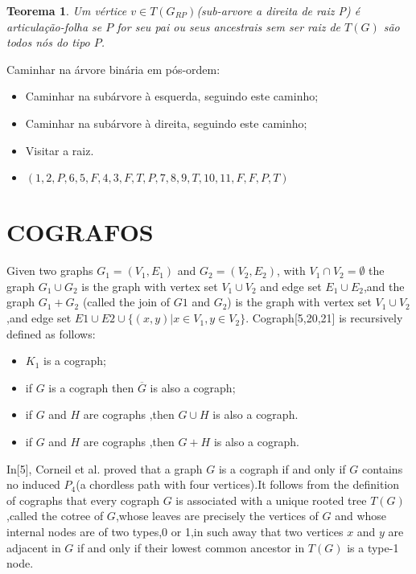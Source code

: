 \documentclass[a4paper,8pt]{article}
\theoremstyle{plain}
\newtheorem{theorem}{Teorema}[section]
\begin{document}
\begin{theorem}
 Um vértice $v\in T(G_{RP})$(sub-arvore a direita de raiz P) é articulação-folha se $P$ for seu pai ou seus ancestrais sem ser raiz de $T(G)$ são todos nós do tipo $P$. 
 \end{theorem}  
 

                                                                                                                    

Caminhar na árvore binária em pós-ordem:
\begin{itemize}
    \item Caminhar na subárvore à esquerda, seguindo este caminho;
    \item Caminhar na subárvore à direita, seguindo este caminho;
    \item Visitar a raiz.
    \item $(1,2,P,6,5,F,4,3,F,T,P,7,8,9,T,10,11,F,F,P,T)$
\end{itemize}


   
   
   
   
   
   
\newpage


\section{COGRAFOS}

Given two graphs $G_1=(V_1,E_1)$ and $G_2=(V_2,E_2)$, with $V_1\cap V_2=\emptyset$ the graph $G_1\cup G_2$ is the graph with vertex set $V_1\cup V_2$ and edge set $E_1\cup E_2$,and the graph $G_1+G_2$ (called the join of $G1$ and $G_2$) is the graph with vertex set $V_1\cup V_2$,and edge set $E1\cup E2 \cup\{(x,y)|x\in V_1,y\in V_2\}$. Cograph[5,20,21] is recursively defined as follows:
\begin{itemize}
    \item $K_1$ is a cograph;
    \item if $G$ is a cograph then $\overline{G}$ is also a cograph;
    \item if $G$ and $H$ are cographs ,then $G\cup H$ is also a cograph.
    \item if $G$ and $H$ are cographs ,then $G+H$ is also a cograph.
\end{itemize}
In[5], Corneil et al. proved that a graph $G$ is a cograph if and only if $G$ contains no induced $P_4$(a chordless path with four vertices).It follows from the definition of cographs that every cograph $G$ is associated with a unique rooted tree $T(G)$,called the cotree of $G$,whose leaves are precisely the vertices of $G$ and whose internal nodes are of two types,0 or 1,in such away that two vertices $x$ and $y$ are adjacent in $G$ if and only if their lowest common ancestor in $T(G)$ is a type-1 node.
\end{document}
